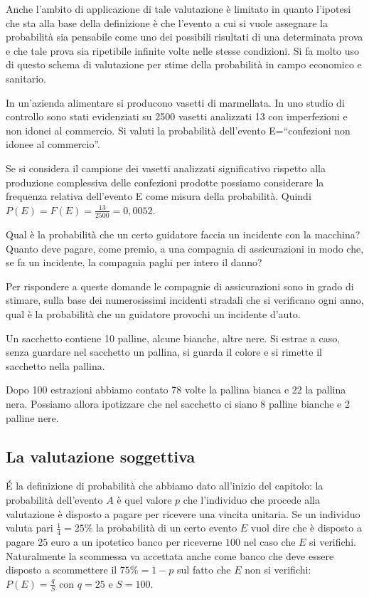 Anche l'ambito di applicazione di tale valutazione è limitato in quanto l'ipotesi che sta alla base della definizione è che l'evento a cui si vuole assegnare la probabilità sia pensabile come uno dei possibili risultati di una determinata prova e che tale prova sia ripetibile infinite volte nelle stesse condizioni.
Si fa molto uso di questo schema di valutazione per stime della probabilità in campo economico e sanitario.

\begin{exrig}
\begin{esempio}
In un'azienda alimentare si producono vasetti di marmellata. In uno studio di controllo sono stati evidenziati su 2500 vasetti analizzati 13 con imperfezioni e non idonei al commercio. Si valuti la probabilità dell'evento E=“confezioni non idonee al commercio”.

Se si considera il campione dei vasetti analizzati significativo rispetto alla produzione complessiva delle confezioni prodotte possiamo considerare la frequenza relativa dell'evento E come misura della probabilità. Quindi $P(E)=F(E)=\frac{13}{2500}=0,0052$.
\end{esempio}

\begin{esempio}
Qual è la probabilità che un certo guidatore faccia un incidente con la macchina? Quanto deve pagare, come premio, a una compagnia di assicurazioni in modo che, se fa un incidente, la compagnia paghi per intero il danno?

Per rispondere a queste domande le compagnie di assicurazioni sono in grado di stimare, sulla base dei numerosissimi incidenti stradali che si verificano ogni anno, qual è la probabilità che un guidatore provochi un incidente d'auto.
\end{esempio}

\begin{esempio}
Un sacchetto contiene 10 palline, alcune bianche, altre nere. Si estrae a caso, senza guardare nel sacchetto un pallina, si guarda il colore e si rimette il sacchetto nella pallina.

Dopo 100 estrazioni abbiamo contato 78 volte la pallina bianca e 22 la pallina nera. Possiamo allora ipotizzare che nel sacchetto ci siano 8 palline bianche e 2 palline nere.
\end{esempio}
\end{exrig}
\subsection{La valutazione soggettiva}
É la definizione di probabilità che abbiamo dato all'inizio del capitolo: la probabilità dell'evento $A$ è quel valore $p$ che l'individuo che procede alla valutazione è disposto a pagare per ricevere una vincita unitaria. Se un individuo valuta pari $\frac 1 4=25\%$ la probabilità di un certo evento $E$ vuol dire che è disposto a pagare $25$ euro a un ipotetico banco per riceverne $100$ nel caso che $E$ si verifichi. Naturalmente la scommessa va accettata anche come banco che deve essere disposto a scommettere il $75\%=1-p$ sul fatto che $E$ non si verifichi: $P(E)=\frac q S$ con $ q=25 $ e $S=100$.
